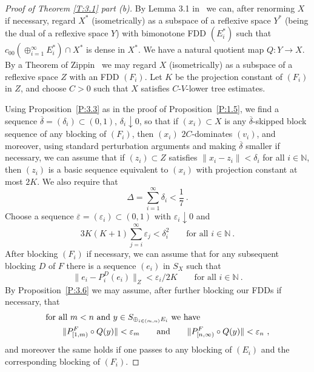 \documentclass[11pt,leqno]{amsart}
\theoremstyle{definition}
\newcommand{\N}{\mathbb{N}}
\newcommand{\vp}{\varepsilon}
\newcommand{\vpb}{\overline\varepsilon}
\newcommand{\deltab}{\overline\delta}
\begin{document}
\begin{proof}[Proof of Theorem \ref{T:3.1} part (b)]

  By Lemma 3.1 in~\cite{OS1} we can, after renorming $X$ if necessary,
  regard $X^*$ (isometrically) as a subspace of a reflexive space
  $Y^*$ (being the dual of a reflexive space $Y$) with bimonotone FDD
  $(E^*_i)$ such that $c_{00}(\oplus_{i=1}^\infty E^*_i)\cap X^*$ is
  dense in $X^*$. We have a natural quotient map $Q:Y\to X$. By a
  Theorem of Zippin~\cite{Z} we may regard $X$ (isometrically) as a
  subspace of a reflexive space $Z$ with an FDD $(F_i)$. Let $K$ be
  the projection constant of $(F_i)$ in $Z$, and choose $C>0$ such
  that $X$ satisfies $C$-$V$-lower tree estimates.

  Using Proposition~\ref{P:3.3} as in the proof of
  Proposition~\ref{P:1.5}, we find a sequence
  $\deltab=(\delta_i)\subset (0,1)$, $\delta_i\downarrow 0$, so that if
  $(x_i)\subset X$ is any $\deltab$-skipped block sequence of any
  blocking of $(F_i)$, then $(x_i)$ $2C$-dominates $(v_i)$, and
  moreover, using standard perturbation arguments and making $\deltab$
  smaller if necessary, we can assume that if $(z_i)\subset Z$
  satisfies $\|x_i-z_i\|<\delta_i$ for all $i\in\N$, then $(z_i)$ is a
  basic sequence equivalent to $(x_i)$ with projection constant at
  most $2K$. We also require that
  \begin{equation}
    \label{E:3.1.5}
    \Delta=\sum_{i=1}^{\infty}\delta_i<\frac17\ .
  \end{equation}
  Choose a sequence $\vpb=(\vp_i)\subset (0,1)$ with $\vp_i\downarrow 0$
  and
  \begin{equation}
    \label{E:3.3}
    3K(K+1)\sum_{j=i}^{\infty}\vp_j<\delta_i^2\qquad\text{for all
    }i\in\N\ .
  \end{equation}
  After blocking $(F_i)$ if necessary, we can assume
  that for any subsequent blocking $D$ of $F$ there is a sequence
  $(e_i)$ in $S_X$ such that
  \begin{equation}
    \label{skipped-block-again}
    \| e_i-P^D_i(e_i)\|_Z<\vp_i/2K\qquad\text{for all } i\in\N\ .
  \end{equation}
  By Proposition~\ref{P:3.6} we may assume, after further blocking our
  FDDs if necessary, that
  \begin{align}
    \label{E:3.1.6}
    &\text{for all $m<n$ and $y\in S_{\oplus_{i\in (m,n)} E_i}$ we
      have}\\
    &\qquad \|P^F_{[1,m)}\circ Q(y)\|<\vp_m\qquad\text{and}\qquad
      \|P^F_{[n,\infty)}\circ Q(y)\|<\vp_n\ ,\notag
  \end{align}
  and moreover the same holds if one passes to any blocking of
  $(E_i)$ and the corresponding blocking of $(F_i)$.


\end{proof}
\end{document}
